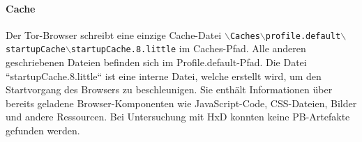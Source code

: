 \begin{appendices}
\paragraph*{Cache}
Der Tor-Browser schreibt eine einzige Cache-Datei \texttt{$\backslash$Caches$\backslash$profile.default$\backslash$\\startupCache$\backslash$startupCache.8.little} im Caches-Pfad. Alle anderen geschriebenen Dateien befinden sich im Profile.default-Pfad.
Die Datei ``startupCache.8.little`` ist eine interne Datei, welche erstellt wird, um den Startvorgang des Browsers zu beschleunigen. Sie enthält Informationen über bereits geladene Browser-Komponenten wie JavaScript-Code, CSS-Dateien, Bilder und andere Ressourcen. \cite{MozillaWiki.05.06.2023} 
Bei Untersuchung mit HxD konnten keine PB-Artefakte gefunden werden.


\end{appendices}
